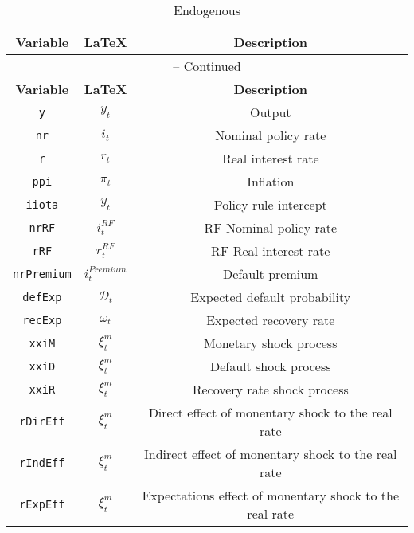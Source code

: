 \begin{center}
\begin{longtable}{ccc}
\caption{Endogenous}\\%
\hline%
\multicolumn{1}{c}{\textbf{Variable}} &
\multicolumn{1}{c}{\textbf{\LaTeX}} &
\multicolumn{1}{c}{\textbf{Description}}\\%
\hline\hline%
\endfirsthead
\multicolumn{3}{c}{{\tablename} \thetable{} -- Continued}\\%
\hline%
\multicolumn{1}{c}{\textbf{Variable}} &
\multicolumn{1}{c}{\textbf{\LaTeX}} &
\multicolumn{1}{c}{\textbf{Description}}\\%
\hline\hline%
\endhead
\texttt{y} & $y_t$ & Output\\
\texttt{nr} & $i_t$ & Nominal policy rate\\
\texttt{r} & $r_t$ & Real interest rate\\
\texttt{ppi} & $\pi_t$ & Inflation\\
\texttt{iiota} & $y_t$ & Policy rule intercept\\
\texttt{nrRF} & $i^{RF}_t$ & RF Nominal policy rate\\
\texttt{rRF} & $r^{RF}_t$ & RF Real interest rate\\
\texttt{nrPremium} & $i^{Premium}_t$ & Default premium\\
\texttt{defExp} & $\mathcal{D}_t$ & Expected default probability\\
\texttt{recExp} & $\omega_t$ & Expected recovery rate\\
\texttt{xxiM} & $\xi^m_t$ & Monetary shock process\\
\texttt{xxiD} & $\xi^m_t$ & Default shock process\\
\texttt{xxiR} & $\xi^m_t$ & Recovery rate shock process\\
\texttt{rDirEff} & $\xi^m_t$ & Direct effect of monentary shock to the real rate\\
\texttt{rIndEff} & $\xi^m_t$ & Indirect effect of monentary shock to the real rate\\
\texttt{rExpEff} & $\xi^m_t$ & Expectations effect of monentary shock to the real rate\\
\hline%
\end{longtable}
\end{center}
